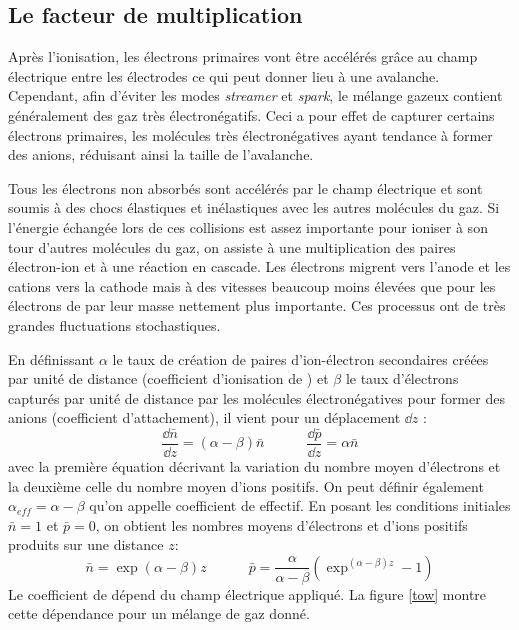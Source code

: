 \subsection{Le facteur de multiplication}
Après l'ionisation, les électrons primaires vont être accélérés grâce au champ électrique entre les électrodes ce qui peut donner lieu à une avalanche. Cependant, afin d'éviter les modes \textit{streamer} et \textit{spark}, le mélange gazeux contient généralement des gaz très électronégatifs. Ceci a pour effet de capturer certains électrons primaires, les molécules très électronégatives ayant tendance à former des anions, réduisant ainsi la taille de l'avalanche. 

Tous les électrons non absorbés sont accélérés par le champ électrique et sont soumis à des chocs élastiques et inélastiques avec les autres molécules du gaz. Si l'énergie échangée lors de ces collisions est assez importante pour ioniser à son tour d'autres molécules du gaz, on assiste à une multiplication des paires électron-ion et à une réaction en cascade. Les électrons migrent vers l'anode et les cations vers la cathode mais à des vitesses beaucoup moins élevées que pour les électrons de par leur masse nettement plus importante. Ces processus ont de très grandes fluctuations stochastiques.

En définissant $\alpha$ le taux de création de paires d'ion-électron secondaires créées par unité de distance (coefficient d'ionisation de ) et  $\beta$ le taux d'électrons capturés par unité de distance par les molécules électronégatives pour former des anions (coefficient d'attachement), il vient pour un déplacement  $\dd z$ :
\begin{equation}
	\frac{\dd \bar{n}}{\dd z}=(\alpha-\beta)\bar{n} \quad \quad \quad \frac{\dd \bar{p}}{\dd z}=\alpha\bar{n} 
\end{equation}
avec la première équation décrivant la variation du nombre moyen d'électrons et la deuxième celle du nombre moyen d'ions positifs. On peut définir également $\alpha_{eff}=\alpha-\beta$ qu'on appelle coefficient de  effectif. En posant les conditions initiales $\bar{n}=1$ et $\bar{p}=0$, on obtient les nombres moyens d'électrons et d'ions positifs produits sur une distance $z$: 
\begin{equation}
\bar{n}=\exp(\alpha-\beta)z \quad \quad \quad \bar{p}=\frac{\alpha}{\alpha-\beta}\left(\exp^{(\alpha-\beta)z}-1\right)
\end{equation}
Le coefficient de  dépend du champ électrique appliqué. La figure \ref{tow} montre cette dépendance pour un mélange de gaz donné.

